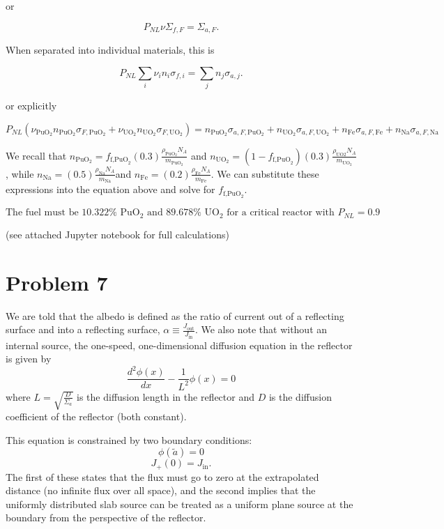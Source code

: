 \documentclass{article}
\begin{document}
or 

$$ P_{NL}\nu \Sigma_{f,F} = \Sigma_{a,F}. $$

When separated into individual materials, this is 

$$ P_{NL}\sum_i \nu_i n_i \sigma_{f,i} = \sum_j n_j \sigma_{a,j} .$$

or explicitly

$$ P_{NL} \left( \nu_{\text{PuO}_2} n_{\text{PuO}_2} \sigma_{F,\text{PuO}_2} + \nu_{\text{UO}_2} n_{\text{UO}_2} \sigma_{F,\text{UO}_2}\right) = n_{\text{PuO}_2} \sigma_{a,F,\text{PuO}_2} + n_{\text{UO}_2} \sigma_{a,F,\text{UO}_2} + n_{\text{Fe}} \sigma_{a,F,\text{Fe}} + n_{\text{Na}} \sigma_{a,F,\text{Na}} $$

We recall that $n_{\text{PuO}_2} = f_{\text{f,PuO}_2}(0.3)\frac{\rho_{\text{PuO}_2} N_A}{m_{\text{PuO}_2}}$ and $n_{\text{UO}_2} = (1-f_{\text{f,PuO}_2})(0.3)\frac{\rho_{\text{UO}2} N_A}{m_{\text{UO}_2}}$, while $n_{\text{Na}} = (0.5)\frac{\rho_{\text{Na}} N_A}{m_{\text{Na}}}$and $n_{\text{Fe}} = (0.2)\frac{\rho_{\text{Fe}} N_A}{m_{\text{Fe}}}$. We can substitute these expressions into the equation above and solve for $f_{\text{f,PuO}_2}$. 

$$\boxed{ \text{The fuel must be } 10.322\% \text{ PuO}_2 \text{ and } 89.678\% \text{ UO}_2 \text{ for a critical reactor with } P_{NL} = 0.9 }$$

(see attached Jupyter notebook for full calculations)




\section*{Problem 7}

We are told that the albedo is defined as the ratio of current out of a reflecting surface and into a reflecting surface, $\alpha \equiv \frac{J_{\text{out}}}{J_{\text{in}}}$. We also note that without an internal source, the one-speed, one-dimensional diffusion equation in the reflector is given by
$$ \frac{d^2\phi(x)}{dx} - \frac{1}{L^2}\phi(x) = 0 $$
where $L = \sqrt{\frac{D}{\Sigma_a}}$ is the diffusion length in the reflector and $D$ is the diffusion coefficient of the reflector (both constant).

This equation is constrained by two boundary conditions: 
$$ \phi(\tilde{a}) = 0 $$
$$ J_+(0) = J_{\text{in}} .$$
The first of these states that the flux must go to zero at the extrapolated distance (no infinite flux over all space), and the second implies that the uniformly distributed slab source can be treated as a uniform plane source at the boundary from the perspective of the reflector.
\end{document}

